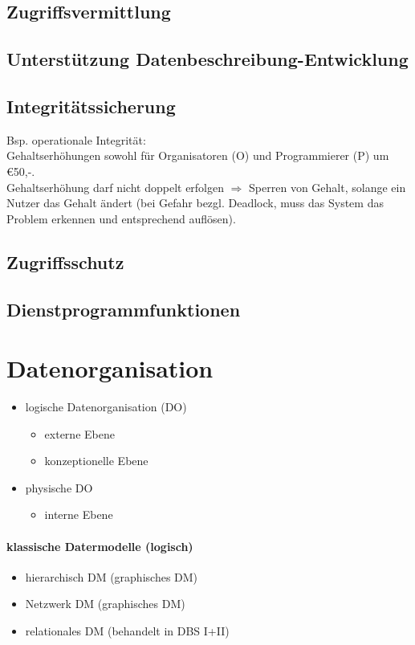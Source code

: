 \subsection{Zugriffsvermittlung}
\subsection{Unterstützung Datenbeschreibung-Entwicklung}
\subsection{Integritätssicherung}
Bsp. operationale Integrität:\\
Gehaltserhöhungen sowohl für Organisatoren (O) und Programmierer (P) um \euro{50,-}.\\
Gehaltserhöhung darf nicht doppelt erfolgen $\Rightarrow$ Sperren von Gehalt, solange ein Nutzer das Gehalt ändert (bei Gefahr bezgl. Deadlock, muss das System das Problem erkennen und entsprechend auflösen).
\subsection{Zugriffsschutz}
\subsection{Dienstprogrammfunktionen}

\section{Datenorganisation}
\begin{itemize}
\item logische Datenorganisation (DO)
\begin{itemize}
\item externe Ebene
\item konzeptionelle Ebene
\end{itemize}
\item physische DO
\begin{itemize}
\item interne Ebene
\end{itemize}
\end{itemize}
\paragraph{klassische Datermodelle (logisch)}
\begin{itemize}
\item hierarchisch DM (graphisches DM)
\item Netzwerk DM (graphisches DM)
\item relationales DM (behandelt in DBS I+II)
\end{itemize}
